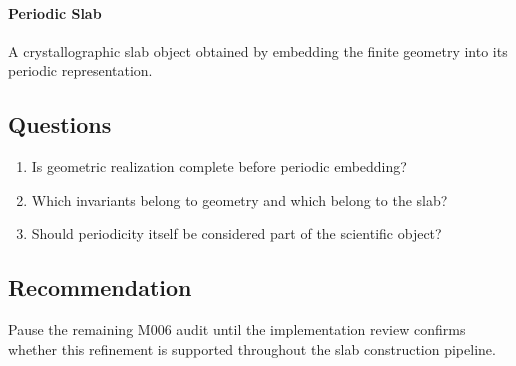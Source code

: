 \paragraph{Periodic Slab}
A crystallographic slab object obtained by embedding the finite geometry
into its periodic representation.

\subsection{Questions}

\begin{enumerate}
\item Is geometric realization complete before periodic embedding?
\item Which invariants belong to geometry and which belong to the slab?
\item Should periodicity itself be considered part of the scientific
object?
\end{enumerate}

\subsection{Recommendation}

Pause the remaining M006 audit until the implementation review confirms
whether this refinement is supported throughout the slab construction
pipeline.
